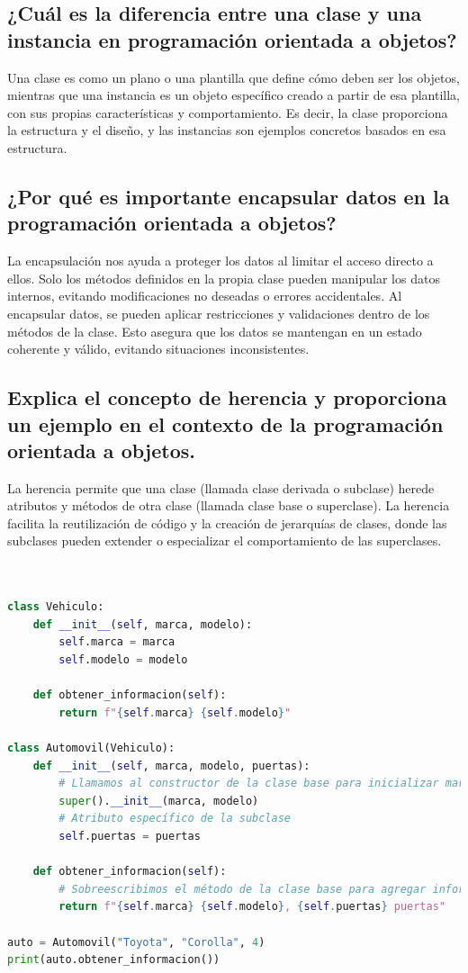 \documentclass[11pt,a4paper]{article}
\begin{document}
\subsection{¿Cuál es la diferencia entre una clase y una instancia en programación orientada a objetos?}

 Una clase es como un plano o una plantilla que define cómo deben ser los objetos, mientras que una instancia es un objeto específico creado a partir de esa plantilla, con sus propias características y comportamiento. Es decir, la clase proporciona la estructura y el diseño, y las instancias son ejemplos concretos basados en esa estructura.

\subsection{¿Por qué es importante encapsular datos en la programación orientada a objetos?}

La encapsulación nos ayuda a proteger los datos al limitar el acceso directo a ellos. Solo los métodos definidos en la propia clase pueden manipular los datos internos, evitando modificaciones no deseadas o errores accidentales. Al encapsular datos, se pueden aplicar restricciones y validaciones dentro de los métodos de la clase. Esto asegura que los datos se mantengan en un estado coherente y válido, evitando situaciones inconsistentes.

\subsection{Explica el concepto de herencia y proporciona un ejemplo en el contexto de la programación orientada a objetos.}

La herencia permite que una clase (llamada clase derivada o subclase) herede atributos y métodos de otra clase (llamada clase base o superclase). La herencia facilita la reutilización de código y la creación de jerarquías de clases, donde las subclases pueden extender o especializar el comportamiento de las superclases.

\begin{lstlisting}[language=Python, style=mystyle, caption={Ejemplo de herencia en Python.}]


class Vehiculo:
    def __init__(self, marca, modelo):
        self.marca = marca
        self.modelo = modelo

    def obtener_informacion(self):
        return f"{self.marca} {self.modelo}"

class Automovil(Vehiculo):
    def __init__(self, marca, modelo, puertas):
        # Llamamos al constructor de la clase base para inicializar marca y modelo
        super().__init__(marca, modelo)
        # Atributo específico de la subclase
        self.puertas = puertas

    def obtener_informacion(self):
        # Sobreescribimos el método de la clase base para agregar información específica
        return f"{self.marca} {self.modelo}, {self.puertas} puertas"

auto = Automovil("Toyota", "Corolla", 4)
print(auto.obtener_informacion())

\end{lstlisting}
\end{document}

